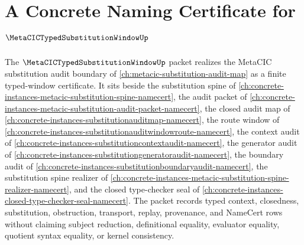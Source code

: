 \chapter{A Concrete Naming Certificate for $\MetaCICTypedSubstitutionWindowUp$}
\label{ch:concrete-instances-metacic-typed-substitution-window-namecert}

The $\MetaCICTypedSubstitutionWindowUp$ packet realizes the MetaCIC substitution audit boundary of \autoref{ch:metacic-substitution-audit-map} as a finite typed-window certificate. It sits beside the substitution spine of \autoref{ch:concrete-instances-metacic-substitution-spine-namecert}, the audit packet of \autoref{ch:concrete-instances-metacic-substitution-audit-packet-namecert}, the closed audit map of \autoref{ch:concrete-instances-substitutionauditmap-namecert}, the route window of \autoref{ch:concrete-instances-substitutionauditwindowroute-namecert}, the context audit of \autoref{ch:concrete-instances-substitutioncontextaudit-namecert}, the generator audit of \autoref{ch:concrete-instances-substitutiongeneratoraudit-namecert}, the boundary audit of \autoref{ch:concrete-instances-substitutionboundaryaudit-namecert}, the substitution spine realizer of \autoref{ch:concrete-instances-metacic-substitution-spine-realizer-namecert}, and the closed type-checker seal of \autoref{ch:concrete-instances-closed-type-checker-seal-namecert}. The packet records typed context, closedness, substitution, obstruction, transport, replay, provenance, and NameCert rows without claiming subject reduction, definitional equality, evaluator equality, quotient syntax equality, or kernel consistency.

